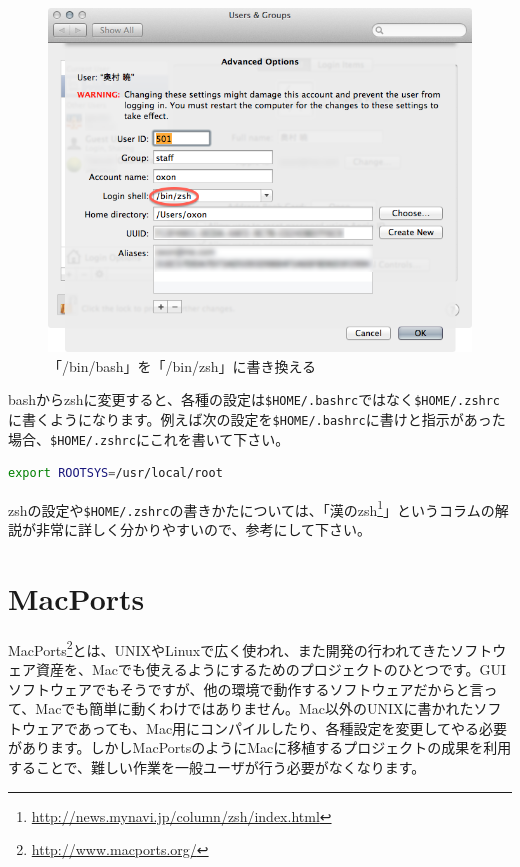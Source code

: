 \begin{figure}
  \begin{center}
    \includegraphics[scale=0.35,bb= 0 0 668 542]{fig/zsh2.png}
    \caption{「/bin/bash」を「/bin/zsh」に書き換える}
    \label{fig_zsh2_png}
  \end{center}
\end{figure}

bashからzshに変更すると、各種の設定は\texttt{\$HOME/.bashrc}ではなく\texttt{\$HOME/.zshrc}に書くようになります。例えば次の設定を\texttt{\$HOME/.bashrc}に書けと指示があった場合、\texttt{\$HOME/.zshrc}にこれを書いて下さい。

\begin{lstlisting}[language=bash]
export ROOTSYS=/usr/local/root
\end{lstlisting}

zshの設定や\texttt{\$HOME/.zshrc}の書きかたについては、「漢のzsh\footnote{\url{http://news.mynavi.jp/column/zsh/index.html}}」というコラムの解説が非常に詳しく分かりやすいので、参考にして下さい。

\section{MacPorts}

MacPorts\footnote{\url{http://www.macports.org/}}とは、UNIXやLinuxで広く使われ、また開発の行われてきたソフトウェア資産を、Macでも使えるようにするためのプロジェクトのひとつです。GUIソフトウェアでもそうですが、他の環境で動作するソフトウェアだからと言って、Macでも簡単に動くわけではありません。Mac以外のUNIXに書かれたソフトウェアであっても、Mac用にコンパイルしたり、各種設定を変更してやる必要があります。しかしMacPortsのようにMacに移植するプロジェクトの成果を利用することで、難しい作業を一般ユーザが行う必要がなくなります。

